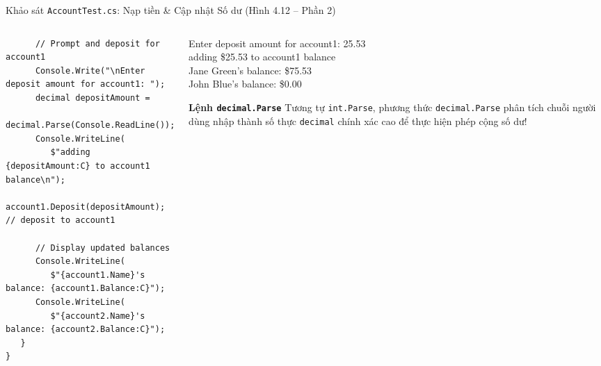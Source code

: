 \documentclass[aspectratio=169, 10pt]{beamer}
\begin{document}
\begin{frame}[fragile]{Khảo sát \texttt{AccountTest.cs}: Nạp tiền \& Cập nhật Số dư (Hình 4.12 -- Phần 2)}
  \begin{columns}[T]
    \begin{column}{0.55\textwidth}
      \begin{tcolorbox}[colback=CodeBg,colframe=UniNavy,title=\textbf{AccountTest.cs Part 2 (Fig. 4.12)},fonttitle=\small\bfseries]
\begin{lstlisting}
      // Prompt and deposit for account1
      Console.Write("\nEnter deposit amount for account1: ");
      decimal depositAmount = 
         decimal.Parse(Console.ReadLine());
      Console.WriteLine(
         $"adding {depositAmount:C} to account1 balance\n");
      account1.Deposit(depositAmount); // deposit to account1

      // Display updated balances
      Console.WriteLine(
         $"{account1.Name}'s balance: {account1.Balance:C}");
      Console.WriteLine(
         $"{account2.Name}'s balance: {account2.Balance:C}");
   }
}
\end{lstlisting}
      \end{tcolorbox}
    \end{column}

    \begin{column}{0.43\textwidth}
      \begin{tcolorbox}[colback=UniDark,colframe=UniNavy,title=\textbf{Output Thực thi Giao dịch},fonttitle=\small\bfseries]
        \color{white}\ttfamily\scriptsize
        Enter deposit amount for account1: 25.53\\
        adding \$25.53 to account1 balance\\[2mm]
        Jane Green's balance: \$75.53\\
        John Blue's balance: \$0.00
      \end{tcolorbox}
      \begin{block}{\textbf{Lệnh \texttt{decimal.Parse}}}
        \small Tương tự \texttt{int.Parse}, phương thức \texttt{decimal.Parse} phân tích chuỗi người dùng nhập thành số thực \texttt{decimal} chính xác cao để thực hiện phép cộng số dư!
      \end{block}
    \end{column}
  \end{columns}
\end{frame}
\end{document}
